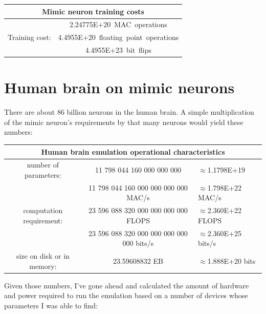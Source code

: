 \documentclass[a4paper]{article}
\begin{document}
	\begin{center}
		\begin{tabular}{| c | c |}
			\hline
			\multicolumn{2}{|c|}{Mimic neuron training costs} \\\hline
			& 2.24775E+20~MAC~operations \\
			Training cost: & 4.4955E+20~floating~point~operations \\
			& 4.4955E+23~bit~flips \\\hline
		\end{tabular}
	\end{center}
	
	\pagebreak
	
	\section{Human brain on mimic neurons}
	
	There are about 86 billion neurons in the human brain. A simple multiplication of the mimic neuron's requirements by that many neurons would yield these numbers:
	
	\begin{center}
		\begin{tabular}{| c | c | l |}
			\hline
			\multicolumn{3}{|c|}{Human brain emulation operational characteristics} \\\hline
			number of parameters: & 11 798 044 160 000 000 000 & $\approx$1.1798E+19 \\\hline
			& 11 798 044 160 000 000 000 000 MAC/s & $\approx$1.798E+22 MAC/s \\
			computation requirement: & 23 596 088 320 000 000 000 000 FLOPS & $\approx$2.360E+22 FLOPS \\
			& 23 596 088 320 000 000 000 000 000 bits/s & $\approx$2.360E+25 bits/s \\\hline
			size on disk or in memory: & 23.59608832 EB & $\approx$1.888E+20 bits \\\hline
		\end{tabular}
	\end{center}
	
	Given those numbers, I've gone ahead and calculated the amount of hardware and power required to run the emulation based on a number of devices whose parameters I was able to find:
	
\end{document}
